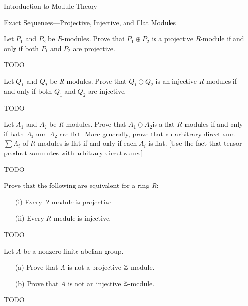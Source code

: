 \begin{chapter}{Introduction to Module Theory}
\begin{section}{Exact Sequences---Projective, Injective, and Flat Modules}
\begin{solution}
\end{solution}\oneperpage



\begin{problem}\label{ex:10.5.3}
Let $P_1$ and $P_2$ be $R$-modules. Prove that $P_1\oplus P_2$ is a projective $R$-module if and only if both $P_1$ and $P_2$ are projective.
\end{problem}
\begin{solution}TODO

\end{solution}\oneperpage



\begin{problem}\label{ex:10.5.4}
Let $Q_1$ and $Q_2$ be $R$-modules. Prove that $Q_1\oplus Q_2$ is an injective $R$-modules if and only if both $Q_1$ and $Q_2$ are injective.
\end{problem}
\begin{solution}TODO

\end{solution}\oneperpage



\begin{problem}\label{ex:10.5.5}
Let $A_1$ and $A_2$ be $R$-modules. Prove that $A_1\oplus A_2$is a flat $R$-modules if and only if both $A_1$ and $A_2$ are flat. More generally, prove that an arbitrary direct sum $\sum A_i$ of $R$-modules is flat if and only if each $A_i$ is flat. [Use the fact that tensor product sommutes with arbitrary direct sums.]
\end{problem}
\begin{solution}TODO

\end{solution}\oneperpage



\begin{problem}\label{ex:10.5.6}
Prove that the following are equivalent for a ring $R$:\begin{itemize}
\item[(i)] Every $R$-module is projective.
\item[(ii)] Every $R$-module is injective.
\end{itemize}
\end{problem}
\begin{solution}TODO

\end{solution}\oneperpage



\begin{problem}\label{ex:10.5.7}
Let $A$ be a nonzero finite abelian group.\begin{enumerate}
\item[(a)] Prove that $A$ is not a projective $\mathbb{Z}$-module.
\item[(b)] Prove that $A$ is not an injective $\mathbb{Z}$-module.
\end{enumerate}
\end{problem}
\begin{solution}TODO


\end{solution}
\end{section}
\end{chapter}
